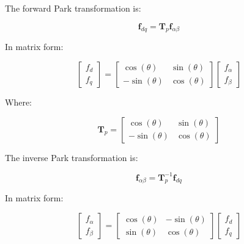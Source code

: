\documentclass{article}
\begin{document}
The forward Park transformation is:

\begin{equation}
    \mathbf{f}_{dq}
    =
    \mathbf{T}_p\mathbf{f}_{\alpha\beta}
\end{equation}

In matrix form:

\begin{equation}
    \begin{bmatrix}
        f_d \\
        f_q
    \end{bmatrix}
    =
    \begin{bmatrix}
        \cos(\theta) & \sin(\theta) \\
        -\sin(\theta) & \cos(\theta)
    \end{bmatrix}
    \begin{bmatrix}
        f_\alpha \\
        f_\beta
    \end{bmatrix}
\end{equation}

Where:

\begin{equation}
    \mathbf{T}_p
    =
    \begin{bmatrix}
        \cos(\theta) & \sin(\theta) \\
        -\sin(\theta) & \cos(\theta)
    \end{bmatrix}
\end{equation}

The inverse Park transformation is:

\begin{equation}
    \mathbf{f}_{\alpha\beta}
    =
    \mathbf{T}_p^{-1}\mathbf{f}_{dq}
\end{equation}

In matrix form:

\begin{equation}
    \begin{bmatrix}
        f_\alpha \\
        f_\beta
    \end{bmatrix}
    =
    \begin{bmatrix}
        \cos(\theta) & -\sin(\theta) \\
        \sin(\theta) & \cos(\theta)
    \end{bmatrix}
    \begin{bmatrix}
        f_d \\
        f_q
    \end{bmatrix}
\end{equation}
\end{document}
